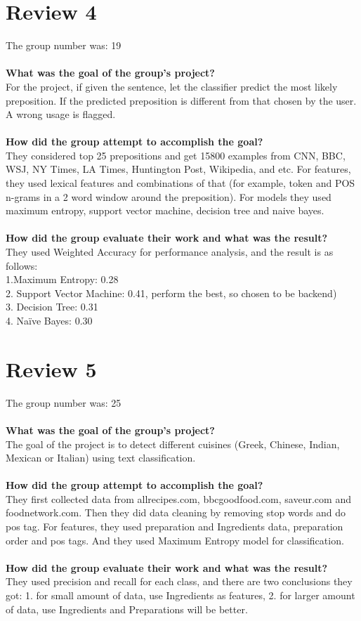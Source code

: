 \documentclass[paper=a4, fontsize=11pt]{scrartcl} %
\numberwithin{equation}{section} %
\numberwithin{figure}{section} %
\numberwithin{table}{section} %
\begin{document}
\section{Review 4}
{The group number was: 19} \\
\ \\
{\bf What was the goal of the group's project?} \\
For the project, if given the sentence, let the classifier predict the most likely preposition. If the predicted preposition is different from that chosen by the user. A wrong usage is flagged.\\
\ \\
{\bf How did the group attempt to accomplish the goal?}\\
They considered top 25 prepositions  and get 15800 examples from CNN, BBC, WSJ, NY Times, LA Times, Huntington Post, Wikipedia, and etc. For features, they used lexical features and combinations of that (for example, token and POS n-grams in a 2 word window around the preposition). 
For models they used maximum entropy, support vector machine, decision tree and naive bayes.\\
\ \\
{\bf How did the group evaluate their work and what was the result?}\\
They used Weighted Accuracy for performance analysis, and the result is as follows:\\
1.Maximum Entropy: 0.28 \\
2. Support Vector Machine: 0.41, perform the best, so chosen to be backend) \\
3. Decision Tree: 0.31\\
4. Naïve Bayes: 0.30

\section{Review 5}
{The group number was: 25} \\
\ \\
{\bf What was the goal of the group's project?} \\
The goal of the project is to detect different cuisines (Greek, Chinese, Indian, Mexican or Italian) using text classification.\\
\ \\
{\bf How did the group attempt to accomplish the goal?}\\
They first collected data from allrecipes.com, bbcgoodfood.com, saveur.com and foodnetwork.com. Then they did data cleaning by removing stop words and do pos tag. For features, they used preparation and Ingredients data,
preparation order and pos tags. And they used Maximum Entropy model for classification.\\
\ \\
{\bf How did the group evaluate their work and what was the result?}\\
They used precision and recall for each class, and there are two conclusions they got: 1. for small amount of data, use Ingredients as features, 2. for larger amount of data, use Ingredients and Preparations will be better.
\end{document}
